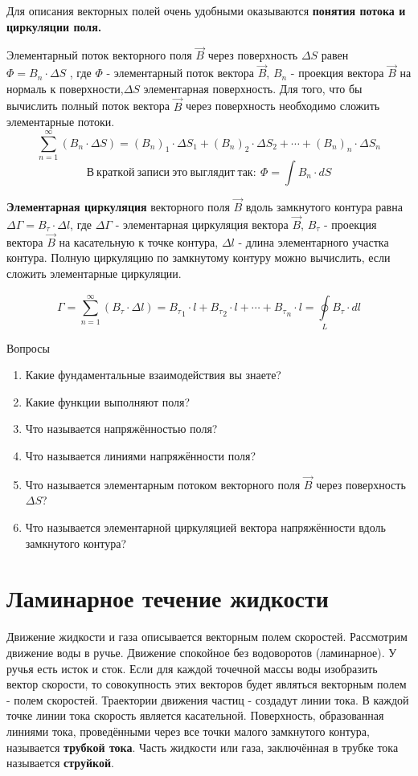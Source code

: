 \documentclass[a6paper, 11pt]{diss_4}
\renewcommand{\'}{\,'}
\begin{document}
  Для описания векторных полей очень удобными оказываются \textbf{понятия
потока и циркуляции поля.}

  Элементарный поток векторного поля $\vec{B}$ через поверхность $\Delta S$
равен $\Phi=B_n\cdot\Delta S$ , где $\Phi$ - элементарный поток вектора
$\vec{B}$, ${B}_n$ - проекция вектора $\vec{B}$ на нормаль к
поверхности,$\Delta S$ элементарная поверхность. Для того, что бы вычислить
полный поток вектора $\vec{B}$ через поверхность необходимо сложить
элементарные потоки.
\[
\sum\limits_{n=1}^{\infty}(B_n\cdot\Delta S)=
(B_n)_1\cdot\Delta S_1+(B_n)_2\cdot\Delta S_2+\cdots+(B_n)_n\cdot\Delta S_n
\]
\[
В\ краткой\ записи\ это\ выглядит\ так:\
\Phi=\int B_n\cdot dS
\]

  \textbf{Элементарная циркуляция} векторного поля $\vec{B}$ вдоль замкнутого
контура равна $\Delta\Gamma=B_\tau\cdot\Delta l$, где $\Delta\Gamma$ -
элементарная циркуляция вектора $\vec{B}$, $B_\tau$ - проекция вектора
$\vec{B}$ на касательную к точке контура, $\Delta l$ - длина элементарного
участка контура. Полную циркуляцию по замкнутому контуру можно вычислить, если
сложить элементарные циркуляции.

\[
\Gamma=\sum\limits_{n=1}^{\infty}(B_\tau\cdot\Delta l)=
{B_\tau}_1\cdot l+{B_\tau}_2\cdot l+\cdots+{B_\tau}_{n}\cdot l=
\oint\limits_{L}^{}B_\tau\cdot dl
\]

\begin{center}
   Вопросы
\end{center}
\begin{enumerate}
\item Какие фундаментальные взаимодействия вы знаете?
\item Какие функции выполняют поля?
\item Что называется напряжённостью поля?
\item Что называется линиями напряжённости поля?
\item Что называется элементарным потоком векторного поля $\vec{B}$
через поверхность $\Delta S$?
\item Что называется элементарной циркуляцией вектора напряжённости
вдоль замкнутого контура?
\end{enumerate}


\section{Ламинарное течение жидкости}

  Движение жидкости и газа описывается векторным полем скоростей. Рассмотрим
движение воды в ручье. Движение спокойное без водоворотов (ламинарное). У
ручья есть исток и сток. Если для каждой точечной массы воды изобразить
вектор скорости, то совокупность этих векторов будет являться векторным полем
- полем скоростей. Траектории движения частиц - создадут линии тока. В каждой
точке линии тока скорость является касательной. Поверхность, образованная
линиями тока, проведёнными через все точки малого замкнутого контура,
называется \textbf{трубкой тока}. Часть жидкости или газа, заключённая в трубке
 тока называется \textbf{струйкой}.
\end{document}
